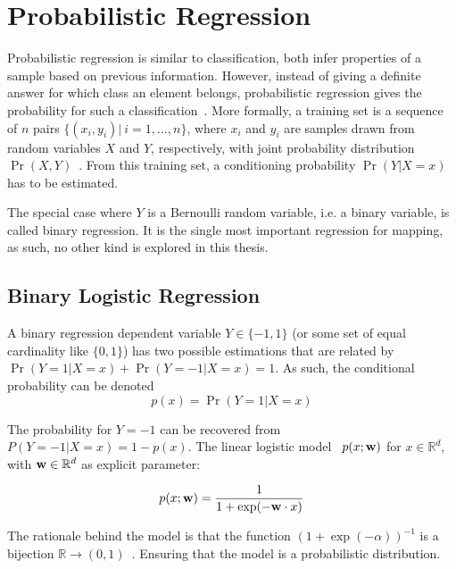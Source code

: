 
\section{Probabilistic Regression}

Probabilistic regression is similar to classification, both infer properties of
a sample based on previous information. However, instead of giving a definite
answer for which class an element belongs, probabilistic regression gives the
probability for such a classification~\cite{jaakkola1999probabilistic}. More
formally, a training set is a sequence of $n$ pairs
$\{(x_i,y_i)|~i=1,\ldots,n\}$, where $x_i$ and $y_i$ are samples drawn from
random variables $X$ and $Y$, respectively, with joint probability distribution
$\Pr(X,Y)$~\cite{friedman2001elements}. From this training set, a conditioning
probability $\Pr(Y|X=x)$ has to be estimated.

The special case where $Y$ is a Bernoulli random variable, i.e. a binary
variable, is called binary regression. It is the single most important
regression for mapping, as such, no other kind is explored in this thesis. 

\subsection{Binary Logistic Regression} 
\label{ss:blr}
A binary regression dependent variable $Y\in\{-1,1\}$
(or some set of equal cardinality like $\{0,1\}$) has two
possible estimations that are related by $\Pr(Y=1|X=x)+\Pr(Y=-1|X=x)=1$. As
such, the conditional probability can be denoted
\begin{equation*}
p(x) = \Pr(Y=1|X=x) 
\end{equation*}

The probability for $Y=-1$ can be recovered from $P(Y=-1|X=x)=1-p(x)$. The
linear logistic model~\cite{ramos2016hilbert} $p(x;\mathrm{\mathbf{w}})$ for
$x\in\mathbb{R}^d$, with $\mathrm{\mathbf{w}}\in\mathbb{R}^d$ as explicit parameter:

\begin{equation}
\label{eq:std_linear_logistic}
p(x;\mathrm{\mathbf{w}}) = \frac{1}{1+\exp(-\mathrm{\mathbf{w}}\cdot x)}
\end{equation}

The rationale behind the model is that the function
$(1+\exp(-\alpha))^{-1}$ is a bijection
$\mathbb{R}\to(0,1)$~\cite{friedman2001elements}. Ensuring that the model is a
probabilistic distribution.

